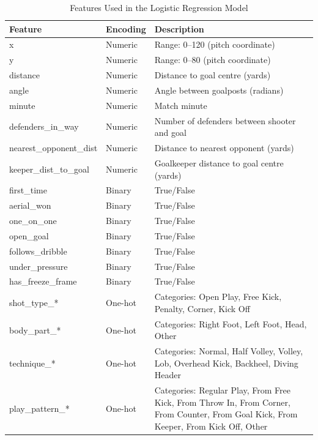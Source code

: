 \documentclass[11pt]{article}
\begin{document}
\begin{table}[H]
\centering
\caption{Features Used in the Logistic Regression Model}
\label{tab:model_features}
\scriptsize
\setlength{\tabcolsep}{3pt}
\renewcommand{\arraystretch}{1.15}
\begin{tabularx}{\columnwidth}{|l|l|X|}
\hline
\textbf{Feature} & \textbf{Encoding} & \textbf{Description} \\ \hline

x & Numeric & Range: 0--120 (pitch coordinate) \\ \hline
y & Numeric & Range: 0--80 (pitch coordinate) \\ \hline
distance & Numeric & Distance to goal centre (yards) \\ \hline
angle & Numeric & Angle between goalposts (radians) \\ \hline
minute & Numeric & Match minute \\ \hline
defenders\_in\_way & Numeric & Number of defenders between shooter and goal \\ \hline
nearest\_opponent\_dist & Numeric & Distance to nearest opponent (yards) \\ \hline
keeper\_dist\_to\_goal & Numeric & Goalkeeper distance to goal centre (yards) \\ \hline

first\_time & Binary & True/False \\ \hline
aerial\_won & Binary & True/False \\ \hline
one\_on\_one & Binary & True/False \\ \hline
open\_goal & Binary & True/False \\ \hline
follows\_dribble & Binary & True/False \\ \hline
under\_pressure & Binary & True/False \\ \hline
has\_freeze\_frame & Binary & True/False \\ \hline

shot\_type\_* & One-hot & Categories: Open Play, Free Kick, Penalty, Corner, Kick Off \\ \hline
body\_part\_* & One-hot & Categories: Right Foot, Left Foot, Head, Other \\ \hline
technique\_* & One-hot & Categories: Normal, Half Volley, Volley, Lob, Overhead Kick, Backheel, Diving Header \\ \hline
play\_pattern\_* & One-hot & Categories: Regular Play, From Free Kick, From Throw In, From Corner, From Counter, From Goal Kick, From Keeper, From Kick Off, Other \\ \hline

\end{tabularx}
\end{table}
\end{document}
